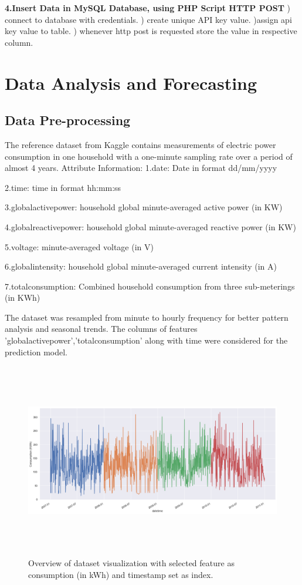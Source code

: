 \documentclass[12 pt]{report}
\begin{document}
 \textbf{4.Insert Data in MySQL Database, using PHP Script HTTP POST}
 ) connect to database with credentials.
 ) create unique API key value.
 )assign api key value to table.
 ) whenever http post is requested store the value in respective column.
 \newline

\section{Data Analysis and Forecasting}
\subsection{Data Pre-processing}
The reference dataset from Kaggle contains measurements of electric power consumption in one household with a one-minute sampling rate over a period of almost 4 years.
\newline
Attribute Information:
\newline
1.date: Date in format dd/mm/yyyy

2.time: time in format hh:mm:ss

3.globalactivepower: household global minute-averaged active power (in KW)

4.globalreactivepower: household global minute-averaged reactive power (in KW)

5.voltage: minute-averaged voltage (in V)

6.globalintensity: household global minute-averaged current intensity (in A)

7.totalconsumption: Combined household consumption from three sub-meterings (in KWh)
\newline

 The dataset was resampled from minute to hourly frequency for better pattern analysis and seasonal trends. The columns of features 'globalactivepower','totalconsumption' along with time were considered for the prediction model.
  \begin{figure}[h!]
\centering
\includegraphics[width=16cm,height = 8.5cm,frame]{images/eda1.png}
\caption{Overview of dataset visualization with selected feature as consumption (in kWh) and timestamp set as index.}
\label{fig:Dataset Overview}
\end{figure}
\end{document}
